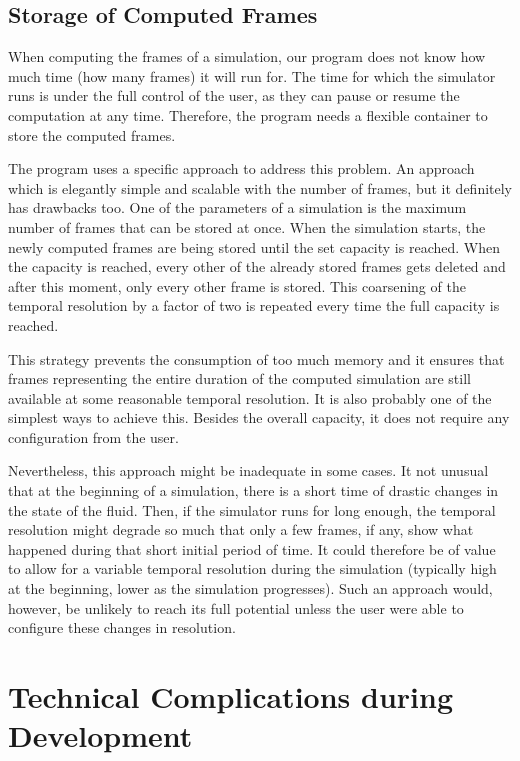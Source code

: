 \documentclass[11pt,a4paper,twoside,openright]{report}
\begin{document}
\subsection{Storage of Computed Frames}
When computing the frames of a simulation, our program does not know how much time (how many frames) it will run for. The time for which the simulator runs is under the full control of the user, as they can pause or resume the computation at any time. Therefore, the program needs a flexible container to store the computed frames.

The program uses a specific approach to address this problem. An approach which is elegantly simple and scalable with the number of frames, but it definitely has drawbacks too. One of the parameters of a simulation is the maximum number of frames that can be stored at once. When the simulation starts, the newly computed frames are being stored until the set capacity is reached. When the capacity is reached, every other of the already stored frames gets deleted and after this moment, only every other frame is stored. This coarsening of the temporal resolution by a factor of two is repeated every time the full capacity is reached.

This strategy prevents the consumption of too much memory and it ensures that frames representing the entire duration of the computed simulation are still available at some reasonable temporal resolution. It is also probably one of the simplest ways to achieve this. Besides the overall capacity, it does not require any configuration from the user.

Nevertheless, this approach might be inadequate in some cases. It not unusual that at the beginning of a simulation, there is a short time of drastic changes in the state of the fluid. Then, if the simulator runs for long enough, the temporal resolution might degrade so much that only a few frames, if any, show what happened during that short initial period of time. It could therefore be of value to allow for a variable temporal resolution during the simulation (typically high at the beginning, lower as the simulation progresses). Such an approach would, however, be unlikely to reach its full potential unless the user were able to configure these changes in resolution.

\section{Technical Complications during Development}
\end{document}
